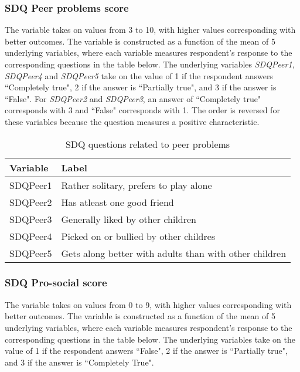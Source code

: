 \subsubsection{SDQ Peer problems score}
The variable takes on values from 3 to 10, with higher values corresponding with better outcomes. The variable is constructed as a function of the mean of 5 underlying variables, where each variable measures respondent's response to the corresponding questions in the table below. The underlying variables \textit{SDQPeer1}, \textit{SDQPeer4} and \textit{SDQPeer5} take on the value of 1 if the respondent answers  ``Completely true", 2 if the answer is ``Partially true", and 3 if the answer is ``False". For \textit{SDQPeer2} and \textit{SDQPeer3}, an answer of ``Completely true" corresponds with 3 and ``False" corresponds with 1. The order is reversed for these variables because the question measures a positive characteristic. \\

\begin{table}[H]
\begin{center}
\footnotesize{
\caption{SDQ questions related to peer problems}
\begin{tabular}{l l}
\hline
\textbf{Variable} & \textbf{Label} \\
\hline
SDQPeer1 & Rather solitary, prefers to play alone\\
SDQPeer2 & Has atleast one good friend\\
SDQPeer3 & Generally liked by other children\\
SDQPeer4 & Picked on or bullied by other childres\\
SDQPeer5 & Gets along better with adults than with other children\\
\hline
\end{tabular}
}
\end{center}
\end{table}

\subsubsection{SDQ Pro-social score}
The variable takes on values from 0 to 9, with higher values corresponding with better outcomes. The variable is constructed as a function of the mean of 5 underlying variables, where each variable measures respondent's response to the corresponding questions in the table below. The underlying variables take on the value of 1 if the respondent answers  ``False", 2 if the answer is ``Partially true", and 3 if the answer is ``Completely True".  \\

